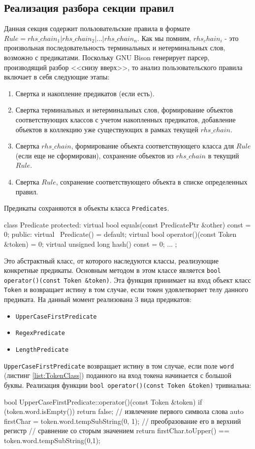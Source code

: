 \subsection{Реализация разбора секции правил}
Данная секция содержит пользовательские правила в формате $Rule = rhs\_chain_1 | rhs\_chain_2 | \dots | rhs\_chain_n$. Как мы помним, $rhs_chain_i$ - это произвольная последовательность терминальных и нетерминальных слов, возможно с предикатами. Поскольку GNU Bison генерирует парсер, производящий разбор <<снизу вверх>>, то анализ пользовательского правила включает в себя следующие этапы:
\begin{enumerate}
  \item Свертка и накопление предикатов (если есть).
  \item Свертка терминальных и нетерминальных слов, формирование объектов соответствующих классов с учетом накопленных предикатов, добавление объектов в коллекцию уже существующих в рамках текущей $rhs\_chain$.
  \item Свертка $rhs\_chain$, формирование объекта соответствующего класса для $Rule$ (если еще не сформирован), сохранение объектов из $rhs\_chain$ в текущий $Rule$.
  \item Свертка $Rule$, сохранение соответствующего объекта в списке определенных правил.
\end{enumerate}
Предикаты сохраняются в объекты класса \lstinline{Predicates}.
\begin{Verb}
class Predicate {
protected:
    virtual bool equals(const PredicatePtr &other) const = 0;
public:
    virtual ~Predicate() = default;
    virtual bool operator()(const Token &token) = 0;
    virtual unsigned long hash() const = 0;
    ...
};
\end{Verb}
Это абстрактный класс, от которого наследуются классы, реализующие конкретные предикаты. Основным методом в этом классе является \lstinline{bool operator()(const Token &token)}. Эта функция принимает на вход объект класс \lstinline{Token} и возвращает истину в том случае, если токен удовлетворяет телу данного предиката. На данный момент реализована 3 вида предикатов:
\begin{itemize}
  \item \lstinline{UpperCaseFirstPredicate}
  \item \lstinline{RegexPredicate}
  \item \lstinline{LengthPredicate}
\end{itemize}

\lstinline{UpperCaseFirstPredicate} возвращает истину в том случае, если поле \lstinline{word} (листинг \ref{list:TokenClass}) поданного на вход токена начинается с большой буквы. Реализация функции \lstinline{bool operator()(const Token &token)} тривиальна:
\begin{Verb}
bool UpperCaseFirstPredicate::operator()(const Token &token) {
    if (token.word.isEmpty()) {
        return false;
    }
    // извлечение первого символа слова
    auto firstChar = token.word.tempSubString(0, 1);
    // преобразование его в верхний регистр
    // сравнение со сторым значением
    return firstChar.toUpper() == token.word.tempSubString(0,1);
}
\end{Verb}

